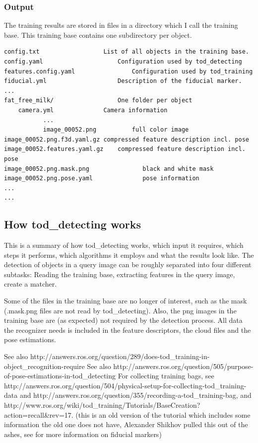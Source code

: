 \subsubsection*{Output}

The training results are stored in files in a directory which I call the
training base. This training base contains one subdirectory per object.

\begin{verbatim}
config.txt                  List of all objects in the training base.
config.yaml                     Configuration used by tod_detecting
features.config.yaml                Configuration used by tod_training
fiducial.yml                    Description of the fiducial marker.
...
fat_free_milk/                  One folder per object
    camera.yml              Camera information
           ...
           image_00052.png          full color image
image_00052.png.f3d.yaml.gz compressed feature description incl. pose
image_00052.features.yaml.gz    compressed feature description incl. pose
image_00052.png.mask.png               black and white mask   
image_00052.png.pose.yaml              pose information
...
...
\end{verbatim}

\subsection*{How tod\_detecting works}

This is a summary of how tod\_detecting works, which input it requires, which
steps it performs, which algorithms it employs and what the results look like.
The detection of objects in a query image can be roughly separated into four
different subtasks: Reading the training base, extracting features in the query
image, create a matcher.

Some of the files in the training base are no longer of interest, such as the
mask (.mask.png files are not read by tod\_detecting). Also, the png images in
the training base are (as expected) not required by the detection process. All
data the recognizer needs is included in the feature descriptors, the cloud
files and the pose estimations.

See also http://answers.ros.org/question/289/does-tod\_training-in-object\_recognition-require
See also http://answers.ros.org/question/505/purpose-of-pose-estimations-in-tod\_detecting
For collecting training bags, see http://answers.ros.org/question/504/physical-setup-for-collecting-tod\_training-data
and http://answers.ros.org/question/355/recording-a-tod\_training-bag, and http://www.ros.org/wiki/tod\_training/Tutorials/BaseCreation?action=recall\&rev=17.
(this is an old version of the tutorial which includes some information the old
one does not have, Alexander Shikhov pulled this out of the ashes, see for more
information on fiducial markers)

